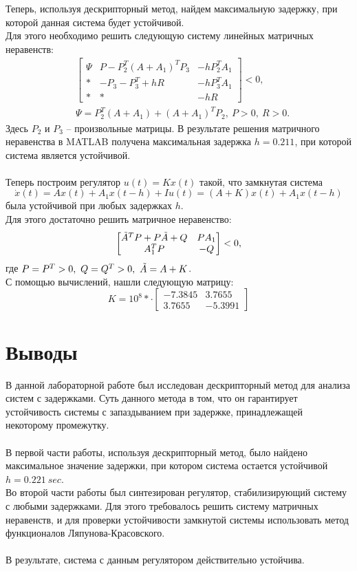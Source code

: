 \documentclass[12pt]{article}
\begin{document}
Теперь, используя дескрипторный метод, найдем максимальную задержку, при которой данная система будет устойчивой. \\
Для этого необходимо решить следующую систему линейных матричных неравенств:
\[
    \begin{split}
        & \begin{bmatrix}
            \Psi & P-P_2^T(A+A_1)^TP_3 & -hP_2^TA_1 \\
            * & -P_3-P_3^T+hR & -hP_3^TA_1 \\
            * & * & -hR
        \end{bmatrix} < 0, \\
        & \Psi = P_2^T(A+A_1)+(A+A_1)^TP_2, \ P>0, \ R>0.
    \end{split}
\]
Здесь $P_2$ и $P_3$ – произвольные матрицы. В результате решения матричного неравенства в MATLAB получена максимальная задержка $h=0.211$, при которой система является устойчивой. \\
\ \\
Теперь построим регулятор $u(t) = Kx(t)$ такой, что замкнутая система
\[
    \dot{x}(t) = Ax(t) + A_1x(t-h) +Iu(t) = (A+K)x(t) + A_1 x(t-h)
\]
была устойчивой при любых задержках $h$. \\
Для этого достаточно решить матричное неравенство:
\[
    \begin{bmatrix}
        \Tilde{A}^TP + P\Tilde{A} + Q & PA_1 \\
        A_1^TP & -Q
    \end{bmatrix} < 0,
\]
где $P = P^T>0, \ Q=Q^T>0, \ \Tilde{A} = A+K$. \\
С помощью вычислений, нашли следующую матрицу:
\[
    K = 10^8* \cdot \begin{bmatrix}
        -7.3845 & 3.7655 \\
        3.7655 & -5.3991
        \end{bmatrix}
\]

\section*{Выводы}
В данной лабораторной работе был исследован дескрипторный метод для анализа систем с задержками. Суть данного метода в том, что он гарантирует устойчивость системы с запаздыванием при задержке, принадлежащей некоторому промежутку.\\
\ \\
В первой части работы, используя дескрипторный метод, было найдено максимальное значение задержки, при котором система остается устойчивой $h = 0.221 \ sec$. \\
Во второй части работы был синтезирован регулятор, стабилизирующий систему с любыми задержками. Для этого требовалось решить систему матричных неравенств, и для проверки устойчивости замкнутой системы использовать метод функционалов Ляпунова-Красовского. \\
\ \\
В результате, система с данным регулятором действительно устойчива.
\end{document}
